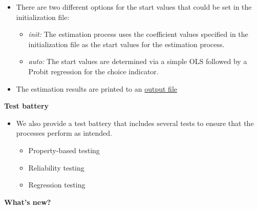 \begin{frame}
\begin{itemize}\setlength\itemsep{1em}
\item There are two different options for the start values that could be set in the initialization file:\medskip
  \begin{itemize}\setlength\itemsep{1em}
  \item \textit{init:} The estimation process uses the coefficient values specified in the initialization file as the start values for the estimation process.
  \item \textit{auto:} The start values are determined via a simple OLS followed by a Probit regression for the choice indicator.
  \end{itemize}
  \item The estimation results are printed to an \href{examples/est.grmpy.info}{output file}
\end{itemize}
\end{frame}

\begin{frame}
\textbf{Test battery}

\medskip
\begin{itemize}\setlength\itemsep{1em}
\item We also provide a test battery that includes several tests to ensure that the processes perform as intended.\medskip
\begin{itemize}\setlength\itemsep{1em}
\item Property-based testing
\item Reliability testing
\item Regression testing
\end{itemize}
\end{itemize}
\end{frame}

\begin{frame}
\begin{center}
\Large{\textbf{What's new?}}
\end{center}
\end{frame}

